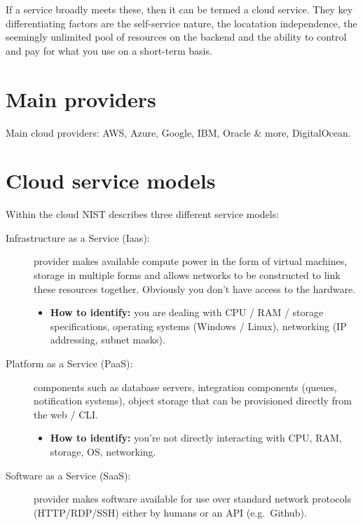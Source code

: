 If a service broadly meets these, then it can be termed a cloud service.
They key differentiating factors are the self-service nature, the
locatation independence, the seemingly unlimited pool of resources on
the backend and the ability to control and pay for what you use on a
short-term basis.

\section{Main providers}
\label{sec:main-providers}

Main cloud providers: AWS, Azure, Google, IBM, Oracle \& more, DigitalOcean. 


\section{Cloud service models}
\label{sec:cloud-service-models}

Within the cloud NIST describes three different service models:

\begin{description}

\item[Infrastructure as a Service (Iaas):]
provider makes available compute power in the form of virtual machines,
storage in multiple forms and allows networks to be constructed to link
these resources together. Obviously you don't have access to the
hardware.

\begin{itemize}

\item
  \textbf{How to identify:} you are dealing with CPU / RAM / storage
  specifications, operating systems (Windows / Linux), networking (IP
  addressing, subnet masks).
\end{itemize}

\item[Platform as a Service (PaaS):]
components such as database servers, integration components (queues,
notification systems), object storage that can be provisioned directly
from the web / CLI.

\begin{itemize}
\item
  \textbf{How to identify:} you're not directly interacting with CPU,
  RAM, storage, OS, networking.
\end{itemize}

\item[Software as a Service (SaaS):]
provider makes software available for use over standard network
protocols (HTTP/RDP/SSH) either by humans or an API (e.g.~Github).
\end{description}

